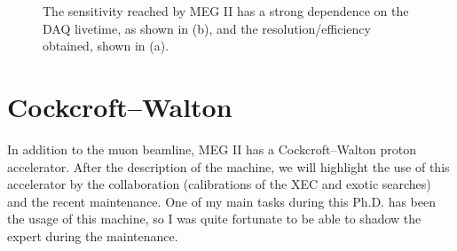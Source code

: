 \begin{refsection}
    \begin{figure}   
        \centering
        \hfill
        \caption[MEG II: resolutions and sensitivity]{The sensitivity reached by MEG II has a strong dependence on the DAQ livetime, as shown in (b), and the resolution/efficiency obtained, shown in (a).}
        \label{fig:MEG:sensitivity}
    \end{figure}

\section{Cockcroft–Walton}
    \label{sec:cw:calib}
    In addition to the muon beamline, MEG II has a Cockcroft–Walton proton accelerator. 
    After the description of the machine, we will highlight the use of this accelerator by the collaboration (calibrations of the XEC and exotic searches) and the recent maintenance.
    One of my main tasks during this Ph.D. has been the usage of this machine, so I was quite fortunate to be able to shadow the expert during the maintenance.


\end{refsection}
